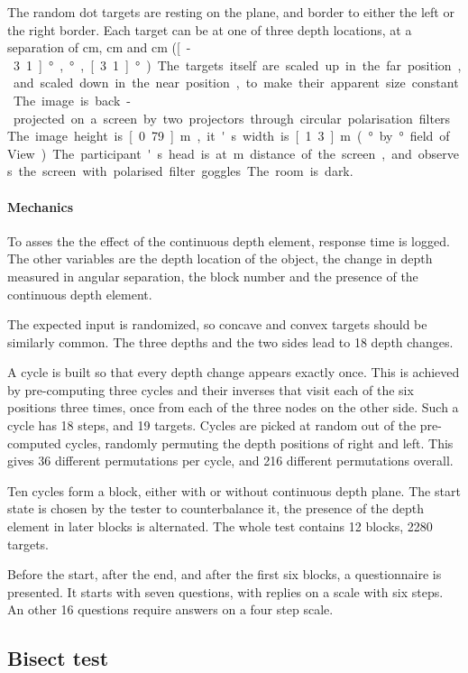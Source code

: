 The random dot targets are resting on the plane, and border to either the left or the right border.
Each target can be at  one of three depth locations, at a separation of \unit[6]{cm}, \unit[0]{cm} and \unit[-6]{cm} (\unit[-3.1]{°}, \unit[0]{°}, \unit[3.1]{°}).
The targets itself are scaled up in the far position, and scaled down in the near position, to make their apparent size constant.

The image is back-projected on a screen by two projectors through circular polarisation filters.
The image height is \unit[0.79]{m}, it's width is \unit[1.3]{m} (\unit[36]{°} by \unit[22]{°} field of View).
The participant's head is at \unit[2]{m} distance of the screen, and observes the screen with polarised filter goggles. The room is dark.

\paragraph{Mechanics}
To asses the the effect of the continuous depth element, response time is logged.
The other variables are the depth location of the object, the change in depth measured in angular separation, the block number and the presence of the continuous depth element.

The expected input is randomized, so concave and convex targets should be similarly common.
The three depths and the two sides lead to 18 depth changes.

A cycle is built so that every depth change appears exactly once.
This is achieved by pre-computing three cycles and their inverses that visit each of the six positions three times, once from each of the three nodes on the other side.
Such a cycle has 18 steps, and 19 targets.
Cycles are picked at random out of the pre-computed cycles, randomly permuting the depth positions of right and left.
This gives 36 different permutations per cycle, and 216 different permutations overall.

Ten cycles form a block, either with or without continuous depth plane.
The start state is chosen by the tester to counterbalance it, the presence of the depth element in later blocks is alternated.
The whole test contains 12 blocks, 2280 targets.

Before the start, after the end, and after the first six blocks, a questionnaire is presented.
It starts with seven questions, with replies on a scale with six steps.
An other 16 questions require answers on a four step scale.


\subsection{Bisect test\label{Bisect}}
